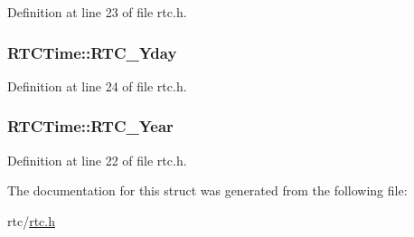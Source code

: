 Definition at line 23 of file rtc.h.

\hypertarget{structRTCTime_aad91737813b216f18c7268b74b33d91a}{
\subsubsection[{RTC\_\-Yday}]{ {\bf RTCTime::RTC\_\-Yday}}}
\label{structRTCTime_aad91737813b216f18c7268b74b33d91a}


Definition at line 24 of file rtc.h.

\hypertarget{structRTCTime_aefae78d754a8ef926f4d646e2b7f4bda}{
\subsubsection[{RTC\_\-Year}]{ {\bf RTCTime::RTC\_\-Year}}}
\label{structRTCTime_aefae78d754a8ef926f4d646e2b7f4bda}


Definition at line 22 of file rtc.h.



The documentation for this struct was generated from the following file:\begin{DoxyCompactItemize}
\item 
rtc/\hyperlink{rtc_8h}{rtc.h}\end{DoxyCompactItemize}
